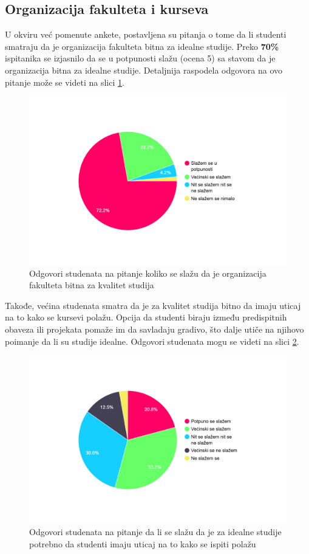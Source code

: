 \documentclass[a4paper]{article}
\begin{document}
\subsection{Organizacija fakulteta i kurseva}
\label{subsec:organizacija_stavovi}

U okviru već pomenute ankete, postavljena su pitanja o tome da li studenti smatraju da je organizacija fakulteta bitna za idealne studije. Preko \textbf{70\%} ispitanika se izjasnilo da se u potpunosti slažu (ocena 5) sa stavom da je organizacija bitna za idealne studije. Detaljnija raspodela odgovora na ovo pitanje može se videti na slici  \ref{fig:organizacija}.
\begin{figure}[h!]
\begin{center}
    \includegraphics[width=0.7\linewidth]{Slike/PieChartOrganizacijaFakulteta.png}
    \caption{Odgovori studenata na pitanje koliko se slažu da je organizacija fakulteta bitna za kvalitet studija}
    \label{fig:organizacija}
\end{center}
\end{figure}

Takođe, većina studenata smatra da je za kvalitet studija bitno da imaju uticaj na to kako se kursevi polažu. Opcija da studenti biraju između predispitnih obaveza ili projekata pomaže im da savladaju gradivo, što dalje utiče na njihovo poimanje da li su studije idealne. Odgovori studenata mogu se videti na slici  \ref{fig:uticaj}. \newpage

\begin{figure}[h!]
\begin{center}
    \includegraphics[width=0.7\linewidth]{Slike/PieChartNacinPolaganja.png}
    \caption{Odgovori studenata na pitanje da li se slažu da je za idealne studije potrebno da studenti imaju uticaj na to kako se ispiti polažu}
    \label{fig:uticaj}
\end{center}
\end{figure}
\end{document}
